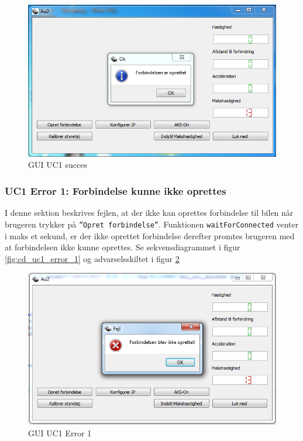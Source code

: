 \begin{figure}[ht!]
\centering
\includegraphics[width=\textwidth* 3/4]{../fig/billeder/gui_uc1_success.png}
\caption{GUI UC1 succes}
\label{fig:GUI_uc1_success}
\end{figure}

\clearpage

\subsubsection{UC1 Error 1: Forbindelse kunne ikke oprettes}
I denne sektion beskrives fejlen, at der ikke kan oprettes forbindelse til bilen når brugeren trykker på \texttt{''Opret forbindelse''}. Funktionen \texttt{waitForConnected} venter i maks et sekund, er der ikke oprettet forbindelse derefter promtes brugeren med at forbindelsen ikke kunne oprettes. Se sekvensdiagrammet i figur \ref{fig:cd_uc1_error_1} og advarselsskiltet i figur \ref{fig:GUI_uc1_error_1}

\begin{figure}[H]
\centering
\includegraphics[width=\textwidth* 3/4]{../fig/billeder/gui_uc1_error_1.png}
\caption{GUI UC1 Error 1}
\label{fig:GUI_uc1_error_1}
\end{figure}

